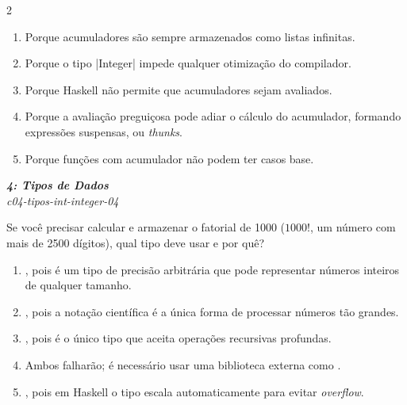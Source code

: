 \documentclass[a4paper,10pt,brazil]{article}
\begin{document}
\begin{multicols}{2}
\begin{enumerate}
  \item Porque acumuladores são sempre armazenados como listas infinitas.

  \item Porque o tipo \haskellinline|Integer| impede qualquer otimização do compilador.

  \item Porque Haskell não permite que acumuladores sejam avaliados.

  \item Porque a avaliação preguiçosa pode adiar o cálculo do acumulador, formando expressões suspensas, ou \emph{thunks}.

  \item Porque funções com acumulador não podem ter casos base.


\end{enumerate}

\begin{flushright}
  \footnotesize
  \textit{\textbf{4: Tipos de Dados}}\\
  \textit{c04-tipos-int-integer-04}\\

\end{flushright}
Se você precisar calcular e armazenar o fatorial de 1000 ($1000!$, um número com mais de 2500 dígitos), qual tipo deve usar e por quê?

\begin{enumerate}
  \item {}, pois é um tipo de precisão arbitrária que pode representar números inteiros de qualquer tamanho.

  \item {}, pois a notação científica é a única forma de processar números tão grandes.

  \item {}, pois é o único tipo que aceita operações recursivas profundas.

  \item Ambos falharão; é necessário usar uma biblioteca externa como .

  \item {}, pois em Haskell o tipo  escala automaticamente para evitar \emph{overflow}.


\end{enumerate}


\end{multicols}
\end{document}
